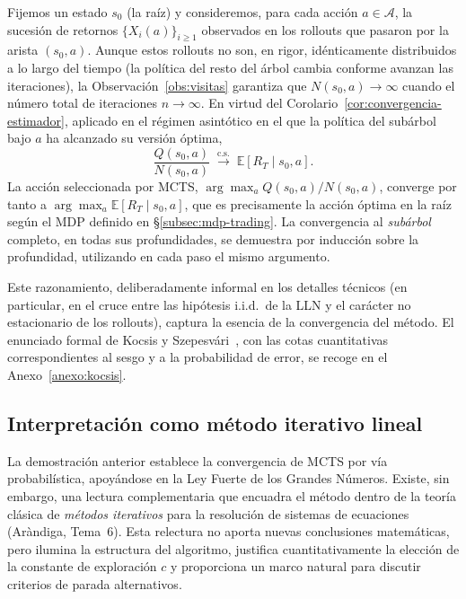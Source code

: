 Fijemos un estado $s_0$ (la raíz) y consideremos, para cada acción $a \in \mathcal{A}$, la sucesión de retornos $\{X_i(a)\}_{i \geq 1}$ observados en los rollouts que pasaron por la arista $(s_0, a)$. Aunque estos rollouts no son, en rigor, idénticamente distribuidos a lo largo del tiempo (la política del resto del árbol cambia conforme avanzan las iteraciones), la Observación~\ref{obs:visitas} garantiza que $N(s_0, a) \to \infty$ cuando el número total de iteraciones $n \to \infty$. En virtud del Corolario~\ref{cor:convergencia-estimador}, aplicado en el régimen asintótico en el que la política del subárbol bajo $a$ ha alcanzado su versión óptima,
\[
    \frac{Q(s_0, a)}{N(s_0, a)} \;\xrightarrow{\text{c.s.}}\; \mathbb{E}[R_T \mid s_0, a].
\]
La acción seleccionada por MCTS, $\arg\max_a Q(s_0,a)/N(s_0,a)$, converge por tanto a $\arg\max_a \mathbb{E}[R_T \mid s_0, a]$, que es precisamente la acción óptima en la raíz según el MDP definido en §\ref{subsec:mdp-trading}. La convergencia al \emph{subárbol} completo, en todas sus profundidades, se demuestra por inducción sobre la profundidad, utilizando en cada paso el mismo argumento.

Este razonamiento, deliberadamente informal en los detalles técnicos (en particular, en el cruce entre las hipótesis i.i.d.\ de la LLN y el carácter no estacionario de los rollouts), captura la esencia de la convergencia del método. El enunciado formal de Kocsis y Szepesvári~\cite{kocsis2006}, con las cotas cuantitativas correspondientes al sesgo y a la probabilidad de error, se recoge en el Anexo~\ref{anexo:kocsis}.

\subsection{Interpretación como método iterativo lineal}
\label{subsec:metodos-iterativos}

La demostración anterior establece la convergencia de MCTS por vía probabilística, apoyándose en la Ley Fuerte de los Grandes Números. Existe, sin embargo, una lectura complementaria que encuadra el método dentro de la teoría clásica de \emph{métodos iterativos} para la resolución de sistemas de ecuaciones (Aràndiga, Tema~6). Esta relectura no aporta nuevas conclusiones matemáticas, pero ilumina la estructura del algoritmo, justifica cuantitativamente la elección de la constante de exploración $c$ y proporciona un marco natural para discutir criterios de parada alternativos.

